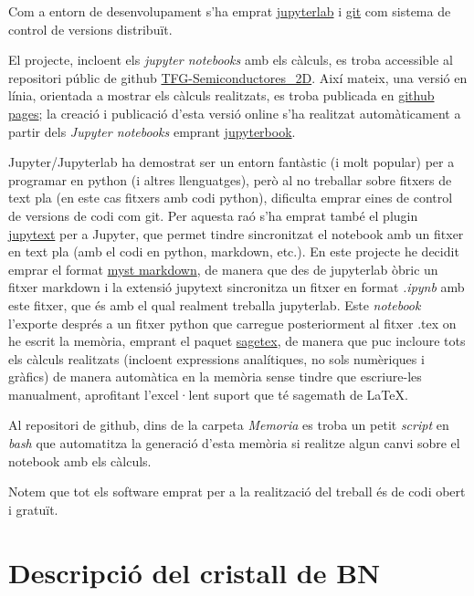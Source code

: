 \documentclass[12pt]{article} %
\begin{document}
Com a entorn de desenvolupament s'ha emprat \href{https://jupyter.org/}{jupyterlab} i \href{https://git-scm.com/}{git} com sistema de control de versions distribuït. 

El projecte, incloent els \textit{\foreignlanguage{english}{jupyter notebooks}} amb els càlculs, es troba accessible al repositori públic de github \href{https://github.com/CasimirVictoria/TFG-Semiconductores\_2D}{TFG-Semiconductores\_2D}. Així mateix, una versió en línia, orientada a mostrar els càlculs realitzats, es troba publicada en \href{https://casimirvictoria.github.io/TFG-Semiconductores_2D/index.html}{github pages}; la creació i publicació d'esta versió online s'ha realitzat automàticament a partir dels \textit{Jupyter notebooks} emprant \href{https://jupyterbook.org/intro.html}{jupyterbook}.

Jupyter/Jupyterlab ha demostrat ser un entorn fantàstic (i molt popular) per a programar en python (i altres llenguatges), però al no treballar sobre fitxers de text pla (en este cas fitxers amb codi python), dificulta emprar eines de control de versions de codi com git. Per aquesta raó s’ha emprat també el plugin \href{https://jupytext.readthedocs.io/en/latest/}{jupytext} per a Jupyter, que permet tindre sincronitzat el notebook amb un fitxer en text pla (amb el codi en python, markdown, etc.). En este projecte he decidit emprar el format \href{https://jupyterbook.org/content/myst.html}{myst markdown}, de manera que des de jupyterlab òbric un fitxer markdown i la extensió jupytext sincronitza un fitxer en format \textit{.ipynb} amb este fitxer, que és amb el qual realment treballa jupyterlab. Este \emph{notebook} l'exporte després a un fitxer python que carregue posteriorment al fitxer .tex on he escrit la memòria, emprant el paquet \href{https://ctan.org/pkg/sagetex}{sagetex}, de manera que puc incloure tots els càlculs realitzats (incloent expressions analítiques, no sols numèriques i gràfics) de manera automàtica en la memòria sense tindre que escriure-les manualment, aprofitant l'excel·lent suport que té sagemath de \LaTeX . 

Al repositori de github, dins de la carpeta \textit{Memoria} es troba un petit \textit{script} en \textit{bash} que automatitza la generació d'esta memòria si realitze algun canvi sobre el notebook amb els càlculs.

Notem que tot els software emprat per a la realització del treball és de codi obert i gratuït.


\newpage
\section{Descripció del cristall de BN}
\end{document}
